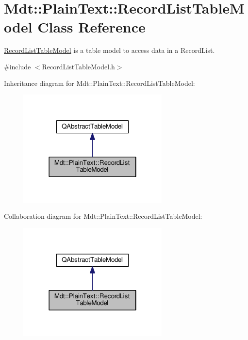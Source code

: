 \hypertarget{class_mdt_1_1_plain_text_1_1_record_list_table_model}{}\section{Mdt\+:\+:Plain\+Text\+:\+:Record\+List\+Table\+Model Class Reference}
\label{class_mdt_1_1_plain_text_1_1_record_list_table_model}


\hyperlink{class_mdt_1_1_plain_text_1_1_record_list_table_model}{Record\+List\+Table\+Model} is a table model to access data in a Record\+List.  




{\ttfamily \#include $<$Record\+List\+Table\+Model.\+h$>$}



Inheritance diagram for Mdt\+:\+:Plain\+Text\+:\+:Record\+List\+Table\+Model\+:
\nopagebreak
\begin{figure}[H]
\begin{center}
\leavevmode
\includegraphics[width=214pt]{class_mdt_1_1_plain_text_1_1_record_list_table_model__inherit__graph}
\end{center}
\end{figure}


Collaboration diagram for Mdt\+:\+:Plain\+Text\+:\+:Record\+List\+Table\+Model\+:
\nopagebreak
\begin{figure}[H]
\begin{center}
\leavevmode
\includegraphics[width=214pt]{class_mdt_1_1_plain_text_1_1_record_list_table_model__coll__graph}
\end{center}
\end{figure}

